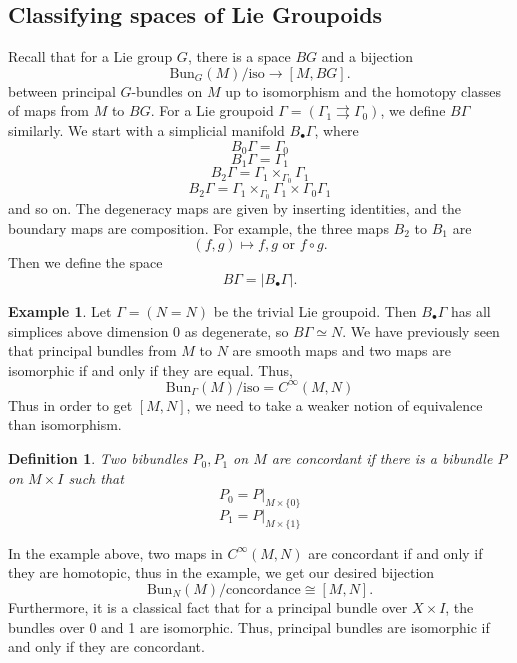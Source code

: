 \documentclass{article}
\newtheorem{definition}[theorem]{Definition}
\newtheorem{proposed work}[theorem]{Proposed Work}
\theoremstyle{definition}
\newtheorem{examplenonit}[theorem]{Example}
\begin{document}
  \subsection{Classifying spaces of Lie Groupoids}
  Recall that for a Lie group $G$, there is a space $BG$ and a bijection
  \[
    \text{Bun}_G(M)/\text{iso}\to [M, BG].
  \]
  between principal $G$-bundles on $M$ up to isomorphism and the homotopy classes of maps from $M$ to $BG$. For a Lie groupoid $\Gamma=(\Gamma_1\rightrightarrows \Gamma_0)$, we define $B\Gamma$ similarly. We start with a simplicial manifold $B_\bullet\Gamma$, where
  \[
    B_0\Gamma = \Gamma_0
\]
\[
    B_1\Gamma = \Gamma_1
\]
\[
    B_2\Gamma = \Gamma_1\times_{\Gamma_0}\Gamma_1
\]
\[
    B_2\Gamma = \Gamma_1\times_{\Gamma_0}\Gamma_1\times{\Gamma_0}\Gamma_1
  \]
  and so on. The degeneracy maps are given by inserting identities, and the boundary maps are composition. For example, the three maps $B_2$ to $B_1$ are
  \[
    (f,g) \mapsto f, g\text{ or } f\circ g.
\]
Then we define the space
  \[
    B\Gamma = |B_\bullet\Gamma|.
  \]
  \begin{examplenonit}
    Let $\Gamma=(N=N)$ be the trivial Lie groupoid. Then $B_\bullet\Gamma$ has all simplices above dimension 0 as degenerate, so $B\Gamma\simeq N$. We have previously seen that principal bundles from $M$ to $N$ are smooth maps and two maps are isomorphic if and only if they are equal. Thus,
    \[
      \text{Bun}_\Gamma(M)/\text{iso} = C^\infty(M,N)
    \]
    Thus in order to get $[M,N]$, we need to take a weaker notion of equivalence than isomorphism.
  \end{examplenonit}
\begin{definition}
  Two bibundles $P_0,P_1$ on $M$ are \emph{concordant} if there is a bibundle $P$ on $M\times I$ such that
  \[
  P_0 = P|_{M\times\{0\}}
\]
  \[
  P_1 = P|_{M\times\{1\}}
\]
\end{definition}
In the example above, two maps in $C^\infty(M,N)$ are concordant if and only if they are homotopic, thus in the example, we get our desired bijection
\[
  \text{Bun}_N(M)/\text{concordance} \cong [M,N].
\]
Furthermore, it is a classical fact that for a principal bundle over $X\times I$, the bundles over 0 and 1 are isomorphic. Thus, principal bundles are isomorphic if and only if they are concordant.
\end{document}
